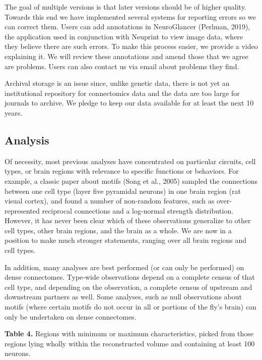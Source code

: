 \documentclass{article}
\begin{document}
The goal of multiple versions is that later versions should be of higher quality. Towards this end we have implemented several systems for reporting errors so we can correct them. Users can add annotations in NeuroGlancer (Perlman, 2019), the application used in conjunction with Neuprint to view image data, where they believe there are such errors. To make this process easier, we provide a video explaining it. We will review these annotations and amend those that we agree are problems. Users can also contact us via email about problems they find.

Archival storage is an issue since, unlike genetic data, there is not yet an institutional repository for connectomics data and the data are too large for journals to archive. We pledge to keep our data available for at least the next 10 years.

\subsection*{Analysis}

Of necessity, most previous analyses have concentrated on particular circuits, cell types, or brain regions with relevance to specific functions or behaviors. For example, a classic paper about motifs (Song et al., 2005) sampled the connections between one cell type (layer five pyramidal neurons) in one brain region (rat visual cortex), and found a number of non-random features, such as over-represented reciprocal connections and a log-normal strength distribution. However, it has never been clear which of these observations generalize to other cell types, other brain regions, and the brain as a whole. We are now in a position to make much stronger statements, ranging over all brain regions and cell types.

In addition, many analyses are best performed (or can only be performed) on dense connectomes. Type-wide observations depend on a complete census of that cell type, and depending on the observation, a complete census of upstream and downstream partners as well. Some analyses, such as null observations about motifs (where certain motifs do not occur in all or portions of the fly’s brain) can only be undertaken on dense connectomes.

\noindent \textbf{Table 4.} Regions with minimum or maximum characteristics, picked from those regions lying wholly within the reconstructed volume and containing at least 100 neurons.
\end{document}
